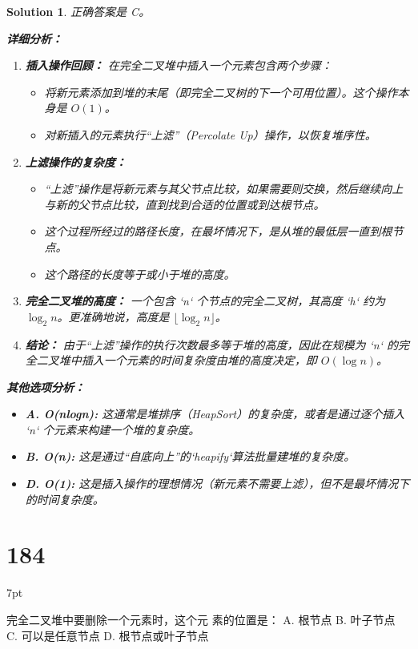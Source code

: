\documentclass[UTF8]{report}
\newtheorem{solution}{Solution}
\theoremstyle{MyLineTheoremStyle} %
\theoremstyle{MyBlockTheoremStyle} %
\theoremstyle{MySubsubsectionStyle} %
\newenvironment{graybox}{%
        \def\FrameCommand{%
        \hspace{1pt}%
        {\color{gray}\small \vrule width 2pt}%
        {\color{graybox_color}\vrule width 4pt}%
        \colorbox{graybox_color}%
        }%
        \MakeFramed{\advance\hsize-\width\FrameRestore}%
        \noindent\hspace{-4.55pt}%
        \begin{adjustwidth}{}{7pt}%
        \vspace{2pt}\vspace{2pt}%
        }
        {%
        \vspace{2pt}\end{adjustwidth}\endMakeFramed%
        }
\begin{document}
\begin{solution}
正确答案是 C。

\textbf{详细分析：}

\begin{enumerate}
    \item \textbf{插入操作回顾：}
    在完全二叉堆中插入一个元素包含两个步骤：
    \begin{itemize}
        \item 将新元素添加到堆的末尾（即完全二叉树的下一个可用位置）。这个操作本身是 $O(1)$。
        \item 对新插入的元素执行“上滤”（Percolate Up）操作，以恢复堆序性。
    \end{itemize}

    \item \textbf{上滤操作的复杂度：}
    \begin{itemize}
        \item “上滤”操作是将新元素与其父节点比较，如果需要则交换，然后继续向上与新的父节点比较，直到找到合适的位置或到达根节点。
        \item 这个过程所经过的路径长度，在最坏情况下，是从堆的最低层一直到根节点。
        \item 这个路径的长度等于或小于堆的高度。
    \end{itemize}

    \item \textbf{完全二叉堆的高度：}
    一个包含 `n` 个节点的完全二叉树，其高度 `h` 约为 $\log_2 n$。更准确地说，高度是 $\lfloor \log_2 n \rfloor$。

    \item \textbf{结论：}
    由于“上滤”操作的执行次数最多等于堆的高度，因此在规模为 `n` 的完全二叉堆中插入一个元素的时间复杂度由堆的高度决定，即 $O(\log n)$。
\end{enumerate}

\textbf{其他选项分析：}
\begin{itemize}
    \item \textbf{A. O(nlogn):} 这通常是堆排序（HeapSort）的复杂度，或者是通过逐个插入 `n` 个元素来构建一个堆的复杂度。
    \item \textbf{B. O(n):} 这是通过“自底向上”的`heapify`算法批量建堆的复杂度。
    \item \textbf{D. O(1):} 这是插入操作的理想情况（新元素不需要上滤），但不是最坏情况下的时间复杂度。
\end{itemize}
\end{solution}


\section*{184}
\begin{graybox}
完全二叉堆中要删除一个元素时，这个元
素的位置是：
A. 根节点
B. 叶子节点
C. 可以是任意节点
D. 根节点或叶子节点
\end{graybox}
\end{document}
